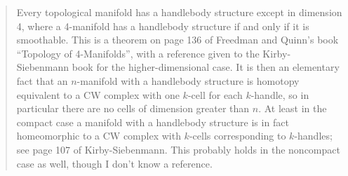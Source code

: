\begin{quote}
Every topological manifold has a handlebody structure except in dimension 4, where a 4-manifold has a handlebody structure if and only if it is smoothable. This is a theorem on page 136 of Freedman and Quinn's book ``Topology of 4-Manifolds'', with a reference given to the Kirby-Siebenmann book for the higher-dimensional case. It is then an elementary fact that an \( n \)-manifold with a handlebody structure is homotopy equivalent to a CW complex with one \( k \)-cell for each \( k \)-handle, so in particular there are no cells of dimension greater than \( n \). At least in the compact case a manifold with a handlebody structure is in fact homeomorphic to a CW complex with \( k \)-cells corresponding to \( k \)-handles; see page 107 of Kirby-Siebenmann. This probably holds in the noncompact case as well, though I don't know a reference.
\end{quote}


